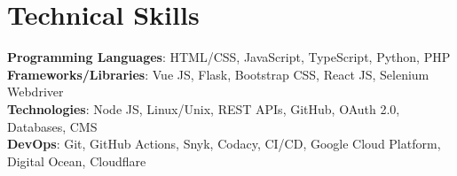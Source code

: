 \section{Technical Skills}
 \begin{itemize}[leftmargin=0.15in, label={}]
    \small{\item{
     \textbf{Programming Languages}{: HTML/CSS, JavaScript, TypeScript, Python, PHP} \\
     \textbf{Frameworks/Libraries}{: Vue JS, Flask, Bootstrap CSS, React JS, Selenium Webdriver} \\
     \textbf{Technologies}{: Node JS, Linux/Unix, REST APIs, GitHub, OAuth 2.0, Databases, CMS } \\
     \textbf{DevOps}{: Git, GitHub Actions, Snyk, Codacy, CI/CD, Google Cloud Platform, Digital Ocean, Cloudflare }
    }}
 \end{itemize}  